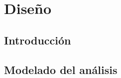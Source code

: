 \chapter{Diseño}

\section{Introducción}

\newpage

\section{Modelado del análisis}

\newpage






